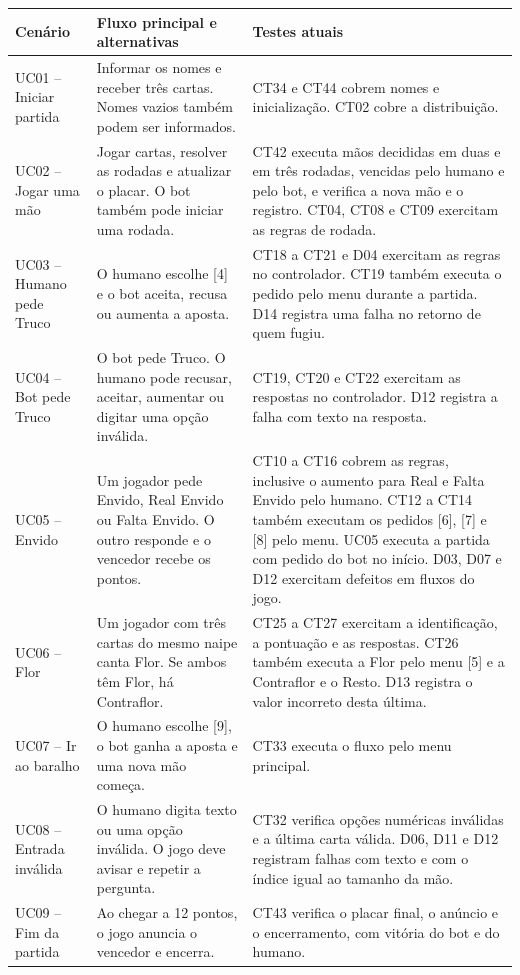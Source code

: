 \documentclass[11pt,a4paper]{article}
\begin{document}
\begin{longtable}{>{\raggedright\arraybackslash}p{}>{\raggedright\arraybackslash}p{}>{\raggedright\arraybackslash}p{}}
\toprule
\rowcolor{cabecalho}\textbf{Cenário} & \textbf{Fluxo principal e alternativas} & \textbf{Testes atuais} \\
\midrule
\endhead
UC01 -- Iniciar partida & Informar os nomes e receber três cartas. Nomes vazios também podem ser informados. & CT34 e CT44 cobrem nomes e inicialização. CT02 cobre a distribuição. \\
UC02 -- Jogar uma mão & Jogar cartas, resolver as rodadas e atualizar o placar. O bot também pode iniciar uma rodada. & CT42 executa mãos decididas em duas e em três rodadas, vencidas pelo humano e pelo bot, e verifica a nova mão e o registro. CT04, CT08 e CT09 exercitam as regras de rodada. \\
UC03 -- Humano pede Truco & O humano escolhe [4] e o bot aceita, recusa ou aumenta a aposta. & CT18 a CT21 e D04 exercitam as regras no controlador. CT19 também executa o pedido pelo menu durante a partida. D14 registra uma falha no retorno de quem fugiu. \\
UC04 -- Bot pede Truco & O bot pede Truco. O humano pode recusar, aceitar, aumentar ou digitar uma opção inválida. & CT19, CT20 e CT22 exercitam as respostas no controlador. D12 registra a falha com texto na resposta. \\
UC05 -- Envido & Um jogador pede Envido, Real Envido ou Falta Envido. O outro responde e o vencedor recebe os pontos. & CT10 a CT16 cobrem as regras, inclusive o aumento para Real e Falta Envido pelo humano. CT12 a CT14 também executam os pedidos [6], [7] e [8] pelo menu. UC05 executa a partida com pedido do bot no início. D03, D07 e D12 exercitam defeitos em fluxos do jogo. \\
UC06 -- Flor & Um jogador com três cartas do mesmo naipe canta Flor. Se ambos têm Flor, há Contraflor. & CT25 a CT27 exercitam a identificação, a pontuação e as respostas. CT26 também executa a Flor pelo menu [5] e a Contraflor e o Resto. D13 registra o valor incorreto desta última. \\
UC07 -- Ir ao baralho & O humano escolhe [9], o bot ganha a aposta e uma nova mão começa. & CT33 executa o fluxo pelo menu principal. \\
UC08 -- Entrada inválida & O humano digita texto ou uma opção inválida. O jogo deve avisar e repetir a pergunta. & CT32 verifica opções numéricas inválidas e a última carta válida. D06, D11 e D12 registram falhas com texto e com o índice igual ao tamanho da mão. \\
UC09 -- Fim da partida & Ao chegar a 12 pontos, o jogo anuncia o vencedor e encerra. & CT43 verifica o placar final, o anúncio e o encerramento, com vitória do bot e do humano. \\
\bottomrule
\end{longtable}
\end{document}
